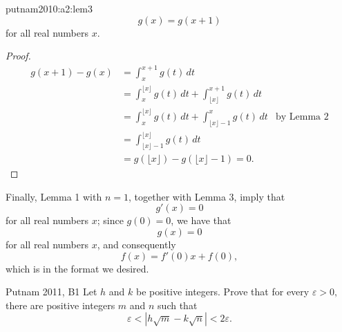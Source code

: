 \begin{sol}{}{}
	\begin{lem}{}{putnam2010:a2:lem3}
		\[
			g(x) = g(x+1)
		\]
		for all real numbers \(x\).
	\end{lem}
	\begin{proof}
		\begin{align*}
			g(x+1) - g(x) &= \int_x^{x+1} g(t)\,dt \\
						  &=  \int_x^{\lfloor x \rfloor} g(t)\,dt + \int_{\lfloor x \rfloor}^{x+1} g(t)\,dt \\
						  &=  \int_x^{\lfloor x \rfloor} g(t)\,dt + \int_{\lfloor x \rfloor - 1}^{x} g(t)\,dt & \text{by Lemma 2}\\
						  &=  \int_{\lfloor x \rfloor - 1}^{\lfloor x \rfloor} g(t)\,dt\\
						  &= g(\lfloor x\rfloor) - g(\lfloor x \rfloor - 1) = 0.
		\end{align*}
	\end{proof}

	Finally, Lemma 1 with \(n = 1\), together with Lemma 3, imply that \[
		g'(x) = 0
	\] for all real numbers \(x\);
	since \(g(0) = 0\), we have that \[
		g(x) = 0
	\]
	for all real numbers \(x\), and consequently \[
		f(x) = f'(0)x + f(0),
	\] which is in the format we desired.
	

\end{sol}
\begin{prob}{Putnam 2011, B1}{}
	Let $h$ and $k$ be positive integers. Prove that for every $\varepsilon >0,$ there are positive integers $m$ and $n$ such that \[\varepsilon < \left|h\sqrt{m}-k\sqrt{n}\right|<2\varepsilon.\]
\end{prob}
